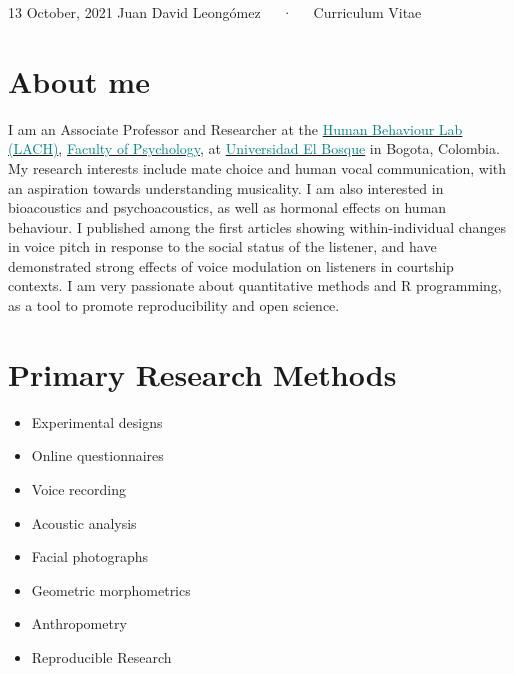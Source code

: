 \documentclass[11pt, a4paper]{awesome-cv}
\begin{document}
\makecvheader

\makecvfooter
  {13 October, 2021}
    {Juan David Leongómez~~~·~~~Curriculum Vitae}
  {\thepage}





\hypertarget{about-me}{%
\section{About me}\label{about-me}}

I am an Associate Professor and Researcher at the
\href{https://www.psicologia.unbosque.edu.co/lach}{\textcolor{teal}{Human Behaviour Lab (LACH)}},
\href{https://www.uelbosque.edu.co/psicologia}{\textcolor{teal}{Faculty of Psychology}},
at
\href{https://www.uelbosque.edu.co/}{\textcolor{teal}{Universidad El Bosque}}
in Bogota, Colombia. My research interests include mate choice and human
vocal communication, with an aspiration towards understanding
musicality. I am also interested in bioacoustics and psychoacoustics, as
well as hormonal effects on human behaviour. I published among the first
articles showing within-individual changes in voice pitch in response to
the social status of the listener, and have demonstrated strong effects
of voice modulation on listeners in courtship contexts. I am very
passionate about quantitative methods and R programming, as a tool to
promote reproducibility and open science.

\hypertarget{primary-research-methods}{%
\section{Primary Research Methods}\label{primary-research-methods}}

\begin{multicols}{2}
\begin{itemize}
 \item Experimental designs
 \item Online questionnaires 
 \item Voice recording
 \item Acoustic analysis
 \item Facial photographs
 \item Geometric morphometrics
 \item Anthropometry
 \item Reproducible Research
\end{itemize}
\end{multicols}
\end{document}
